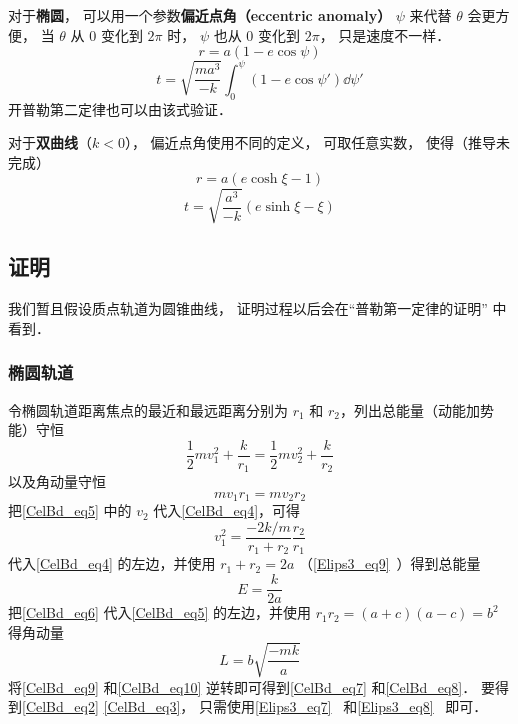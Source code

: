 对于\textbf{椭圆}， 可以用一个参数\textbf{偏近点角（eccentric anomaly）} $\psi$ 来代替 $\theta$ 会更方便， 当 $\theta$ 从 $0$ 变化到 $2\pi$ 时， $\psi$ 也从 $0$ 变化到 $2\pi$， 只是速度不一样．
\begin{equation}
r = a(1-e\cos\psi)
\end{equation}
\begin{equation}
t = \sqrt{\frac{ma^3}{-k}} \int_0^\psi (1 - e\cos\psi')\dd{\psi'}
\end{equation}
开普勒第二定律也可以由该式验证．

对于\textbf{双曲线}（$k<0$）， 偏近点角使用不同的定义， 可取任意实数， 使得（推导未完成）
\begin{equation}
r = a(e\cosh\xi - 1)
\end{equation}
\begin{equation}
t = \sqrt{\frac{a^3}{-k}} (e\sinh\xi - \xi)
\end{equation}

\subsection{证明}
我们暂且假设质点轨道为圆锥曲线， 证明过程以后会在“普勒第一定律的证明” 中看到．

\subsubsection{椭圆轨道}
令椭圆轨道距离焦点的最近和最远距离分别为 $r_1$ 和 $r_2$，列出总能量（动能加势能）守恒
\begin{equation}\label{CelBd_eq4}
\frac12 m v_1^2 + \frac{k}{r_1} = \frac12 mv_2^2 + \frac{k}{r_2}
\end{equation}
以及角动量守恒
\begin{equation}\label{CelBd_eq5}
mv_1 r_1 = mv_2 r_2
\end{equation}
把\autoref{CelBd_eq5} 中的 $v_2$ 代入\autoref{CelBd_eq4}，可得
\begin{equation}\label{CelBd_eq6}
v_1^2 = \frac{-2k/m}{r_1 + r_2} \frac{r_2}{r_1}
\end{equation}
代入\autoref{CelBd_eq4} 的左边，并使用 $r_1+r_2=2a$ （\autoref{Elips3_eq9}~）得到总能量
\begin{equation}\label{CelBd_eq9}
E = \frac{k}{2a}
\end{equation}
把\autoref{CelBd_eq6} 代入\autoref{CelBd_eq5} 的左边，并使用 $r_1 r_2 = (a+c)(a-c) =b^2$ %
得角动量
\begin{equation}\label{CelBd_eq10}
L = b\sqrt{\frac{-mk}{a}}
\end{equation}
将\autoref{CelBd_eq9} 和\autoref{CelBd_eq10} 逆转即可得到\autoref{CelBd_eq7} 和\autoref{CelBd_eq8}． 要得到\autoref{CelBd_eq2} \autoref{CelBd_eq3}， 只需使用\autoref{Elips3_eq7}~ 和\autoref{Elips3_eq8}~ 即可．

